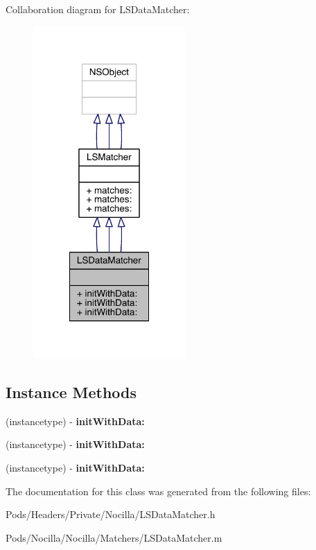 Collaboration diagram for L\-S\-Data\-Matcher\-:\nopagebreak
\begin{figure}[H]
\begin{center}
\leavevmode
\includegraphics[width=164pt]{interface_l_s_data_matcher__coll__graph}
\end{center}
\end{figure}
\subsection*{Instance Methods}
\begin{DoxyCompactItemize}
\item 
\hypertarget{interface_l_s_data_matcher_a6b00e8442d5bd7b0563753f455f57637}{(instancetype) -\/ {\bfseries init\-With\-Data\-:}}\label{interface_l_s_data_matcher_a6b00e8442d5bd7b0563753f455f57637}

\item 
\hypertarget{interface_l_s_data_matcher_a6b00e8442d5bd7b0563753f455f57637}{(instancetype) -\/ {\bfseries init\-With\-Data\-:}}\label{interface_l_s_data_matcher_a6b00e8442d5bd7b0563753f455f57637}

\item 
\hypertarget{interface_l_s_data_matcher_a6b00e8442d5bd7b0563753f455f57637}{(instancetype) -\/ {\bfseries init\-With\-Data\-:}}\label{interface_l_s_data_matcher_a6b00e8442d5bd7b0563753f455f57637}

\end{DoxyCompactItemize}


The documentation for this class was generated from the following files\-:\begin{DoxyCompactItemize}
\item 
Pods/\-Headers/\-Private/\-Nocilla/L\-S\-Data\-Matcher.\-h\item 
Pods/\-Nocilla/\-Nocilla/\-Matchers/L\-S\-Data\-Matcher.\-m\end{DoxyCompactItemize}
